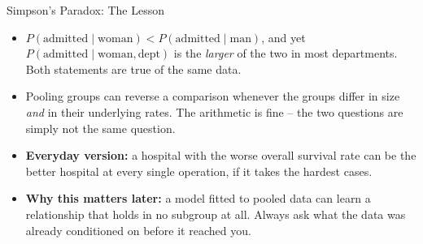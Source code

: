 \begin{frame}{Simpson's Paradox: The Lesson}
\begin{itemize}
  \item $P(\text{admitted} \mid \text{woman}) < P(\text{admitted} \mid \text{man})$, and yet $P(\text{admitted} \mid \text{woman}, \text{dept})$ is the \emph{larger} of the two in most departments. Both statements are true of the same data.
  \pause
  \item Pooling groups can reverse a comparison whenever the groups differ in size \emph{and} in their underlying rates. The arithmetic is fine -- the two questions are simply not the same question.
  \pause
  \item \textbf{Everyday version:} a hospital with the worse overall survival rate can be the better hospital at every single operation, if it takes the hardest cases.
  \pause
  \item \textbf{Why this matters later:} a model fitted to pooled data can learn a relationship that holds in no subgroup at all. Always ask what the data was already conditioned on before it reached you.
\end{itemize}
\end{frame}
